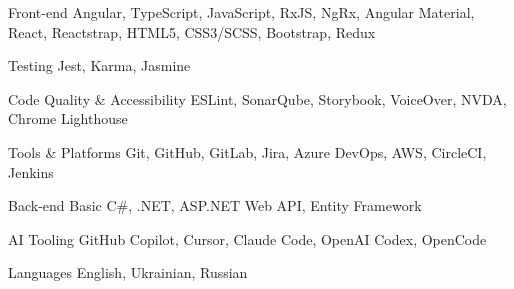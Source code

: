 

\begin{cvskills}

  \cvskill
  {Front-end}
  {Angular, TypeScript, JavaScript, RxJS, NgRx, Angular Material, React, Reactstrap, HTML5, CSS3/SCSS, Bootstrap, Redux}

  \cvskill
  {Testing}
  {Jest, Karma, Jasmine}

  \cvskill
  {Code Quality \& Accessibility}
  {ESLint, SonarQube, Storybook, VoiceOver, NVDA, Chrome Lighthouse}

  \cvskill
  {Tools \& Platforms}
  {Git, GitHub, GitLab, Jira, Azure DevOps, AWS, CircleCI, Jenkins}

  \cvskill
  {Back-end}
  {Basic C\#, .NET, ASP.NET Web API, Entity Framework}

  \cvskill
  {AI Tooling}
  {GitHub Copilot, Cursor, Claude Code, OpenAI Codex, OpenCode}

  \cvskill
  {Languages}
  {English, Ukrainian, Russian}

\end{cvskills}